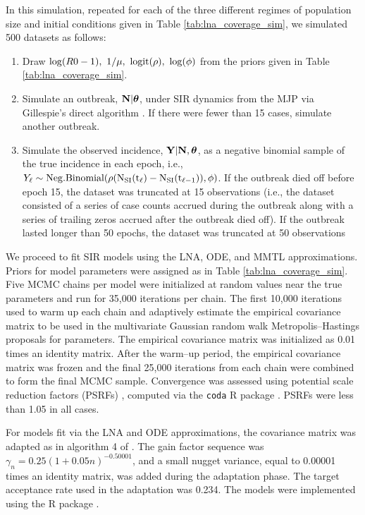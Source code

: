 In this simulation, repeated for each of the three different regimes of population size and initial conditions given in Table \ref{tab:lna_coverage_sim}, we simulated 500 datasets as follows:
\begin{enumerate}
	\item Draw $ \log(R0 - 1),\ 1/\mu,\ \logit(\rho),\ \log(\phi) $ from the priors given in Table \ref{tab:lna_coverage_sim}.
	\item Simulate an outbreak, $ \mathbf{N}|\boldsymbol{\theta} $, under SIR dynamics from the MJP via Gillespie's direct algorithm \cite{gillespie1976general}. If there were fewer than 15 cases, simulate another outbreak. 
	\item Simulate the observed incidence, $ \mathbf{Y}|\mathbf{N},\boldsymbol{\theta} $, as a negative binomial sample of the true incidence in each epoch, i.e., $ Y_\ell\sim\mathrm{Neg.Binomial(\rho(N_{SI}(t_\ell) - N_{SI}(t_{\ell-1})), \phi)} $. If the outbreak died off before epoch 15, the dataset was truncated at 15 observations (i.e., the dataset consisted of a series of case counts accrued during the outbreak along with a series of trailing zeros accrued after the outbreak died off). If the outbreak lasted longer than 50 epochs, the dataset was truncated at 50 observations
\end{enumerate}

We proceed to fit SIR models using the LNA, ODE, and MMTL approximations. Priors for model parameters were assigned as in Table \ref{tab:lna_coverage_sim}. Five MCMC chains per model were initialized at random values near the true parameters and run for 35,000 iterations per chain. The first 10,000 iterations used to warm up each chain and adaptively estimate the empirical covariance matrix to be used in the multivariate Gaussian random walk Metropolis--Hastings proposals for parameters. The empirical covariance matrix was initialized as 0.01 times an identity matrix. After the warm--up period, the empirical covariance matrix was frozen and the final 25,000 iterations from each chain were combined to form the final MCMC sample. Convergence was assessed using potential scale reduction factors (PSRFs) \cite{brooks1998general}, computed via the \texttt{coda} R package \cite{codapackage}. PSRFs were less than 1.05 in all cases.

For models fit via the LNA and ODE approximations, the covariance matrix was adapted as in algorithm 4 of \cite{andrieu2008tutorial}. The gain factor sequence was $\gamma_n = 0.25(1 + 0.05n)^{-0.50001}$, and a small nugget variance, equal to 0.00001 times an identity matrix, was added during the adaptation phase. The target acceptance rate used in the adaptation was 0.234. The models were implemented using the  R package \cite{stemr}.

